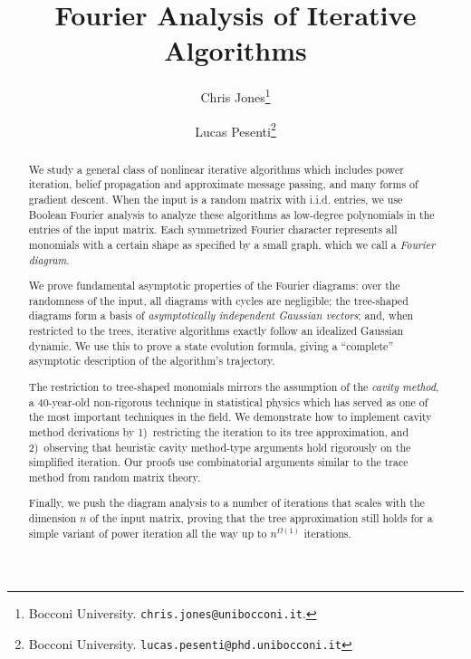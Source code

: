 \documentclass[12pt]{article}
\title{Fourier Analysis of Iterative Algorithms}
\author{Chris Jones\thanks{Bocconi University. \texttt{chris.jones@unibocconi.it}.} \and Lucas Pesenti\thanks{Bocconi University. \texttt{lucas.pesenti@phd.unibocconi.it} }}
\begin{document}
\pagestyle{empty}

\maketitle{}

\thispagestyle{empty}

\begin{abstract}
    We study a general class of nonlinear iterative algorithms which includes power iteration, belief propagation and approximate message passing, and many forms of gradient descent. When the input is a random matrix with i.i.d. entries, we use Boolean Fourier analysis to analyze these algorithms as low-degree polynomials in the entries of the input matrix.
    Each symmetrized Fourier character represents all monomials with a certain shape as specified by a small graph, which we call a \emph{Fourier diagram}.

    We prove fundamental asymptotic properties of the Fourier diagrams: over the randomness of the input,
    all diagrams with cycles are negligible; the tree-shaped diagrams form a basis of \emph{asymptotically independent Gaussian vectors}; and, when restricted to the trees, iterative algorithms exactly follow an idealized Gaussian dynamic.
    We use this to prove a state evolution formula, giving a ``complete'' asymptotic description of the algorithm's trajectory.

    
    The restriction to tree-shaped monomials mirrors the assumption of the  \emph{cavity method}, a 40-year-old non-rigorous technique in statistical physics which has served as one of the most important techniques in the field.
    We demonstrate how to implement cavity method derivations by 1)~restricting the iteration to its
    tree approximation, and 2)~observing
    that heuristic cavity method-type arguments hold
    rigorously on the simplified
    iteration. Our proofs use combinatorial arguments similar to the trace method from random matrix theory.
    
    Finally, we push the diagram analysis to a number of iterations that scales with the dimension $n$ of the input matrix, proving that the tree approximation still holds for a simple variant of power iteration all the way up to $n^{\Omega(1)}$ iterations.
\end{abstract}

 \newpage

\tableofcontents
\newpage
\cleardoublepage
{}
\pagestyle{plain}
\end{document}

